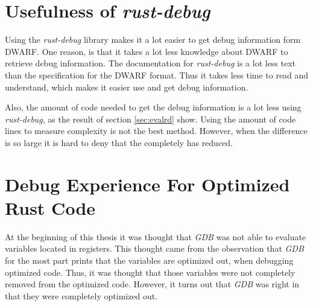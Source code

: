 


\section{Usefulness of \emph{rust-debug}} %
Using the \emph{rust-debug} library makes it a lot easier to get debug information form \gls{DWARF}.
One reason, is that it takes a lot less knowledge about \gls{DWARF} to retrieve debug information.
The documentation for \emph{rust-debug} is a lot less text than the specification for the \gls{DWARF} format.
Thus it takes less time to read and understand, which makes it easier use and get debug information.


Also, the amount of code needed to get the debug information is a lot less using \emph{rust-debug}, as the result of section \ref{sec:evalrd} show.
Using the amount of code lines to measure complexity is not the best method.
However, when the difference is so large it is hard to deny that the completely has reduced. 





\section{Debug Experience For Optimized Rust Code} %
At the beginning of this thesis it was thought that \emph{GDB} was not able to evaluate variables located in registers.
This thought came from the observation that \emph{GDB} for the most part prints that the variables are optimized out, when debugging optimized code.
Thus, it was thought that those variables were not completely removed from the optimized code.
However, it turns out that \emph{GDB} was right in that they were completely optimized out.


